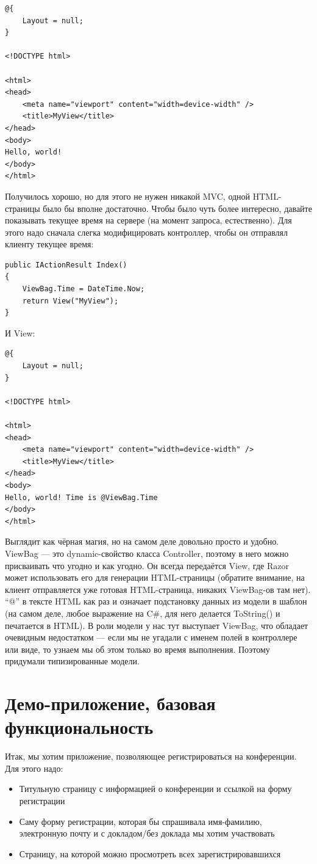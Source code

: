 \documentclass[a5paper]{article}
\begin{document}
\begin{verbatim}
@{
    Layout = null;
}

<!DOCTYPE html>

<html>
<head>
    <meta name="viewport" content="width=device-width" />
    <title>MyView</title>
</head>
<body>
Hello, world!
</body>
</html>
\end{verbatim}

Получилось хорошо, но для этого не нужен никакой MVC, одной HTML-страницы было бы вполне достаточно. Чтобы было чуть более интересно, давайте показывать текущее время на сервере (на момент запроса, естественно). Для этого надо сначала слегка модифицировать контроллер, чтобы он отправлял
клиенту текущее время:

\begin{verbatim}
public IActionResult Index()
{
    ViewBag.Time = DateTime.Now;
    return View("MyView");
}
\end{verbatim}

И View:

\begin{verbatim}
@{
    Layout = null;
}

<!DOCTYPE html>

<html>
<head>
    <meta name="viewport" content="width=device-width" />
    <title>MyView</title>
</head>
<body>
Hello, world! Time is @ViewBag.Time
</body>
</html>
\end{verbatim}

Выглядит как чёрная магия, но на самом деле довольно просто и удобно. ViewBag --- это dynamic-свойство класса Controller, поэтому в него можно присваивать что угодно и как угодно. Он всегда передаётся View, где Razor может использовать его для генерации HTML-страницы 
(обратите внимание, на клиент отправляется уже готовая HTML-страница, никаких ViewBag-ов там нет). ``@'' в тексте HTML как раз и означает подстановку данных из модели в шаблон (на самом деле, любое выражение на C\#, для него делается ToString() и печатается в HTML). В роли модели у нас тут
выступает ViewBag, что обладает очевидным недостатком --- если мы не угадали с именем полей в контроллере или виде, то узнаем мы об этом только во время выполнения. Поэтому придумали типизированные модели.

\section{Демо-приложение, базовая функциональность}

Итак, мы хотим приложение, позволяющее регистрироваться на конференции. Для этого надо:
\begin{itemize}
	\item Титульную страницу с информацией о конференции и ссылкой на форму регистрации
	\item Саму форму регистрации, которая бы спрашивала имя-фамилию, электронную почту и с докладом/без доклада мы хотим участвовать
	\item Страницу, на которой можно просмотреть всех зарегистрировавшихся
\end{itemize}
\end{document}
